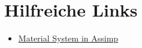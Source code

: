 \chapter{Hilfreiche Links}
\begin{itemize}
	\item \href{http://www.assimp.org/lib_html/materials.html}{Material System in Assimp}
\end{itemize}
